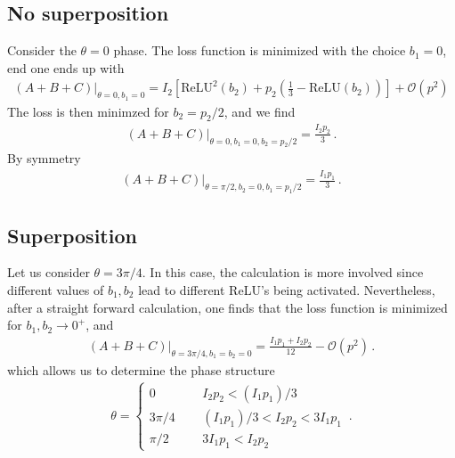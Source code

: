 \documentclass[a4paper]{article}
\begin{document}
\subsection{No superposition}
Consider the $\theta=0$ phase. The loss function is minimized with the choice $b_1=0$, end one ends up with
\begin{align}
(A+B+C)\bigg |_{\theta=0,b_1=0} = I_2 \left[ \text{ReLU}^2(b_2)+p_2\left( \frac13 -\text{ReLU}(b_2)\right)\right] +\mathcal{O}(p^2)
\end{align}
The loss is then minimzed for $b_2=p_2/2$, and we find
\begin{align}
(A+B+C)\bigg |_{\theta=0,b_1=0,b_2=p_2/2} = \frac{I_2 p_2}{3}\,. 
\end{align}
By symmetry
\begin{align}
(A+B+C)\bigg |_{\theta=\pi/2,b_2=0,b_1=p_1/2} = \frac{I_1 p_1}{3}\,. 
\end{align}
\subsection{Superposition}
Let us consider $\theta=3\pi/4$. In this case, the calculation is more involved since different values of $b_1,b_2$ lead to different ReLU's being activated. Nevertheless, after a straight forward calculation, one finds that the loss function is minimized for $b_1,b_2 \to 0^+$, and 
\begin{align}
(A+B+C)\bigg |_{\theta=3\pi/4,b_1=b_2=0} = \frac{I_1 p_1+I_2 p_2}{12}-\mathcal{O}(p^2)\,.
\end{align}
which allows us to determine the phase structure 
\begin{align}
\theta = \begin{cases}
0 & I_2 p_2<(I_1 p_1)/3
\\
3\pi/4\;\;\;\;\; &(I_1 p_1)/3< I_2 p_2 < 3 I_1 p_1
\\
\pi/2 & 3 I_1 p_1<I_2 p_2
\end{cases}\,.
\end{align}
\end{document}

